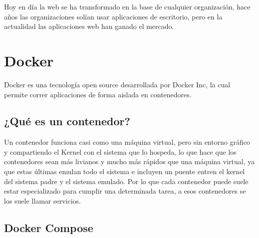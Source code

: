 Hoy en día la web se ha transformado en la base de cualquier organización, hace años las organizaciones solían usar aplicaciones de escritorio, pero en la actualidad las aplicaciones web han ganado el mercado.

\section{Docker}


Docker es una tecnología open source desarrollada por Docker Inc, la cual permite correr aplicaciones de forma aislada en contenedores.

\subsection{¿Qué es un contenedor?}

Un contenedor funciona casi como una máquina virtual, pero sin entorno gráfico y compartiendo el Kernel \cite{keepcoding_que_2022} con el sistema que lo hospeda, lo que hace que los contenedores sean más livianos y mucho más rápidos que una máquina virtual, ya que estas últimas emulan todo el sistema e incluyen un puente entren el kernel del sistema padre y el sistema emulado. Por lo que cada contenedor puede suele estar especializado para cumplir una determinada tarea, a esos contenedores se los suele llamar servicios.

\subsection{Docker Compose}

